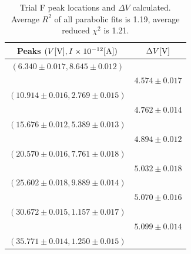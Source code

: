 \documentclass[12pt]{article}
\begin{document}
\begin{table}[h!]
    \centering
    \caption{\centering Trial F peak locations and $\Delta V$ calculated. Average $R^2$ of all parabolic fits is 1.19, average reduced $\chi^2$ is 1.21.}   
    \begin{tabular}{cc}
        \toprule
        Peaks $(V [{\rm V}], I \times10^{-12}[{\rm A}])$ & $\Delta V{\rm [V]}$ \\
        \midrule
        $(6.340 \pm 0.017, 8.645 \pm 0.012)$ & \\
        & $4.574 \pm 0.017$ \\
        $(10.914 \pm 0.016, 2.769 \pm 0.015)$ & \\
        & $4.762 \pm 0.014$ \\
        $(15.676 \pm 0.012, 5.389 \pm 0.013)$ & \\
        & $4.894 \pm 0.012$ \\
        $(20.570 \pm 0.016, 7.761 \pm 0.018)$ & \\
        & $5.032 \pm 0.018$ \\
        $(25.602 \pm 0.018, 9.889 \pm 0.014)$ & \\
        & $5.070 \pm 0.016$ \\
        $(30.672 \pm 0.015, 1.157 \pm 0.017)$ & \\
        & $5.099 \pm 0.014$ \\
        $(35.771 \pm 0.014, 1.250 \pm 0.015)$ & \\
        \bottomrule
    \end{tabular}
    \label{table:F_peaks}
\end{table}
\end{document}
